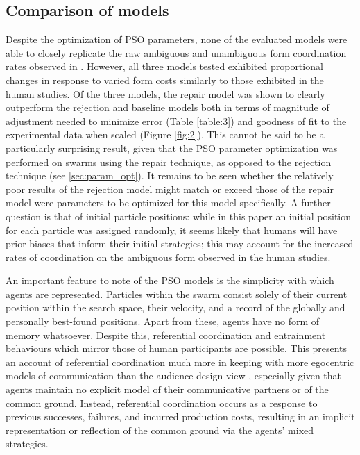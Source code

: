 \documentclass[12pt,a4paper]{article}
\begin{document}
\subsection{Comparison of models}
Despite the optimization of PSO parameters, none of the evaluated models were able to closely replicate the raw ambiguous and unambiguous form coordination rates observed in \citeauthor{rohde2012}. However, all three models tested exhibited proportional changes in response to varied form costs similarly to those exhibited in the human studies. Of the three models, the repair model was shown to clearly outperform the rejection and baseline models both in terms of magnitude of adjustment needed to minimize error (Table \ref{table:3}) and goodness of fit to the experimental data when scaled (Figure \ref{fig:2}). This cannot be said to be a particularly surprising result, given that the PSO parameter optimization was performed on swarms using the repair technique, as opposed to the rejection technique (see \ref{sec:param_opt}). It remains to be seen whether the relatively poor results of the rejection model might match or exceed those of the repair model were parameters to be optimized for this model specifically. A further question is that of initial particle positions: while in this paper an initial position for each particle was assigned randomly, it seems likely that humans will have prior biases that inform their initial strategies; this may account for the increased rates of coordination on the ambiguous form observed in the \citeauthor{rohde2012} human studies.

An important feature to note of the PSO models is the simplicity with which agents are represented. Particles within the swarm consist solely of their current position within the search space, their velocity, and a record of the globally and personally best-found positions. Apart from these, agents have no form of memory whatsoever. Despite this, referential coordination and entrainment behaviours which mirror those of human participants are possible. This presents an account of referential coordination much more in keeping with more egocentric models of communication \citep{horton1996} than the audience design view \citep{clark1982}, especially given that agents maintain no explicit model of their communicative partners or of the common ground. Instead, referential coordination occurs as a response to previous successes, failures, and incurred production costs, resulting in an implicit representation or reflection of the common ground via the agents' mixed strategies. 
\end{document}
